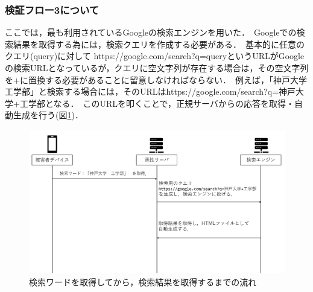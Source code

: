 \documentclass[dvipdfmx]{jsarticle}
\begin{document}
            \subsubsection{検証フロー3について}
                ここでは，最も利用されているGoogleの検索エンジンを用いた．\
                Googleでの検索結果を取得する為には，検索クエリを作成する必要がある．\
                基本的に任意のクエリ(query)に対して https://google.com/search?q=queryというURLがGoogleの検索URLとなっているが，クエリに空文字列が存在する場合は，その空文字列を+に置換する必要があることに留意しなければならない．\
                例えば，「神戸大学　工学部」と検索する場合には，そのURLはhttps://google.com/search?q=神戸大学+工学部となる．\
                このURLを叩くことで，正規サーバからの応答を取得・自動生成を行う(図\ref{flow-no3})．\\
                \begin{figure}[pth]
                    \centering
                    \includegraphics[width=15cm]{img/vc-vf-3.png}
                    \caption{検索ワードを取得してから，検索結果を取得するまでの流れ}
                    \label{flow-no3} 
                \end{figure}
                \clearpage
\end{document}
